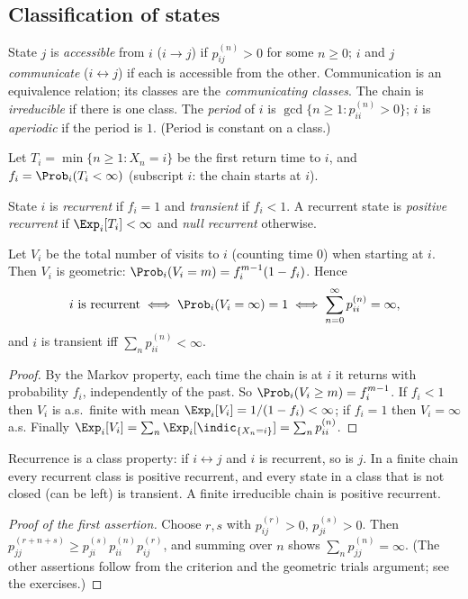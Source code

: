 \subsection{Classification of states}

\begin{definition}
State $j$ is \emph{accessible} from $i$ ($i\to j$) if $p^{(n)}_{ij}>0$ for some
$n\ge0$; $i$ and $j$ \emph{communicate} ($i\leftrightarrow j$) if each is accessible
from the other. Communication is an equivalence relation; its classes are the
\emph{communicating classes}. The chain is \emph{irreducible} if there is one class.
The \emph{period} of $i$ is $\gcd\{n\ge1:p^{(n)}_{ii}>0\}$; $i$ is \emph{aperiodic}
if the period is $1$. (Period is constant on a class.)
\end{definition}

Let $T_i=\min\{n\ge1:X_n=i\}$ be the first return time to $i$, and
$f_i=\Prob_i(T_i<\infty)$ (subscript $i$: the chain starts at $i$).

\begin{definition}[Recurrence]
State $i$ is \emph{recurrent} if $f_i=1$ and \emph{transient} if $f_i<1$. A recurrent
state is \emph{positive recurrent} if $\Exp_i[T_i]<\infty$ and \emph{null recurrent}
otherwise.
\end{definition}

\begin{theorem}\label{thm:reccrit}
Let $V_i$ be the total number of visits to $i$ (counting time $0$) when starting at
$i$. Then $V_i$ is geometric: $\Prob_i(V_i=m)=f_i^{m-1}(1-f_i)$. Hence
\[
i\text{ is recurrent}\iff\Prob_i(V_i=\infty)=1\iff\sum_{n=0}^\infty p^{(n)}_{ii}=\infty,
\]
and $i$ is transient iff $\sum_np^{(n)}_{ii}<\infty$.
\end{theorem}
\begin{proof}
By the Markov property, each time the chain is at $i$ it returns with probability
$f_i$, independently of the past. So $\Prob_i(V_i\ge m)=f_i^{m-1}$. If $f_i<1$ then
$V_i$ is a.s.\ finite with mean $\Exp_i[V_i]=1/(1-f_i)<\infty$; if $f_i=1$ then
$V_i=\infty$ a.s. Finally $\Exp_i[V_i]=\sum_n\Exp_i[\indic_{\{X_n=i\}}]=\sum_np^{(n)}_{ii}$.
\end{proof}

\begin{corollary}
Recurrence is a class property: if $i\leftrightarrow j$ and $i$ is recurrent, so is $j$.
In a finite chain every recurrent class is positive recurrent, and every state in a class
that is not closed (can be left) is transient. A finite irreducible chain is positive
recurrent.
\end{corollary}
\begin{proof}[Proof of the first assertion]
Choose $r,s$ with $p^{(r)}_{ij}>0$, $p^{(s)}_{ji}>0$. Then
$p^{(r+n+s)}_{jj}\ge p^{(s)}_{ji}p^{(n)}_{ii}p^{(r)}_{ij}$, and summing over $n$ shows
$\sum_np^{(n)}_{jj}=\infty$. (The other assertions follow from the criterion and the
geometric trials argument; see the exercises.)
\end{proof}

